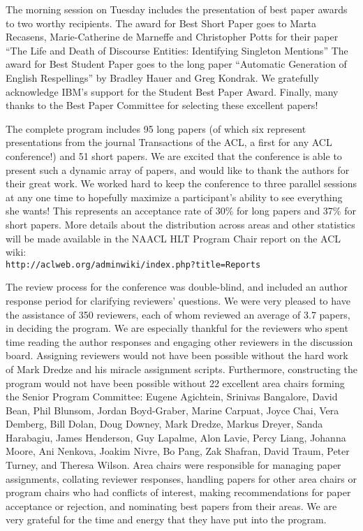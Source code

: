 The morning session on Tuesday includes the presentation of best paper awards to two worthy recipients. The award for Best Short Paper goes to Marta Recasens, Marie-Catherine de Marneffe and Christopher Potts for their paper ``The Life and Death of Discourse Entities: Identifying Singleton Mentions'' The award for Best Student Paper goes to the long paper ``Automatic Generation of English Respellings'' by Bradley Hauer and Greg Kondrak. We gratefully acknowledge IBM’s support for the Student Best Paper Award. Finally, many thanks to the Best Paper Committee for selecting these excellent papers!

The complete program includes 95 long papers (of which six represent presentations from the journal Transactions of the ACL, a first for any ACL conference!) and 51 short papers. We are excited that the conference is able to present such a dynamic array of papers, and would like to thank the authors for their great work. We worked hard to keep the conference to three parallel sessions at any one time to hopefully maximize a participant's ability to see everything she wants! This represents an acceptance rate of 30\% for long papers and 37\% for short papers. More details about the distribution across areas and other statistics will be made available in the NAACL HLT Program Chair report on the ACL wiki: \\\texttt{http://aclweb.org/adminwiki/index.php?title=Reports}

The review process for the conference was double-blind, and included an author response period for
clarifying reviewers’ questions. We were very pleased to have the assistance of 350 reviewers, each of whom reviewed an average of 3.7 papers, in deciding the program. We are especially thankful for the reviewers who spent time reading the author responses and engaging other reviewers in the discussion board. Assigning reviewers would not have been possible without the hard work of Mark Dredze and his miracle assignment scripts. Furthermore, constructing the program would not have been possible without 22 excellent area chairs forming the Senior Program Committee: Eugene Agichtein, Srinivas Bangalore, David Bean, Phil Blunsom, Jordan Boyd-Graber, Marine Carpuat, Joyce Chai, Vera Demberg, Bill Dolan, Doug Downey, Mark Dredze, Markus Dreyer, Sanda Harabagiu, James Henderson, Guy Lapalme, Alon Lavie, Percy Liang, Johanna Moore, Ani Nenkova, Joakim Nivre, Bo Pang, Zak Shafran, David Traum, Peter Turney, and Theresa Wilson. Area chairs were responsible for managing paper assignments, collating reviewer responses, handling papers for other area chairs or program chairs who had conflicts of interest, making recommendations for paper acceptance or rejection, and nominating best papers from their areas. We are very grateful for the time and energy that they have put into the program.

